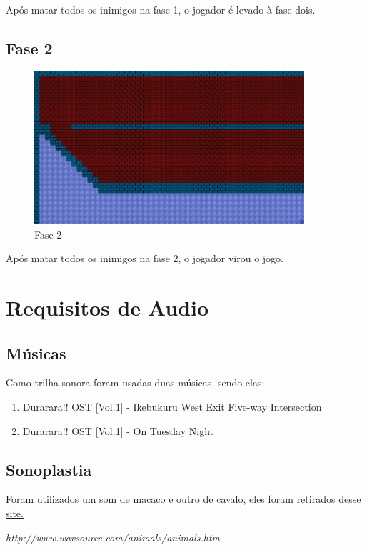 \documentclass[12pt]{article}
\begin{document}
Após matar todos os inimigos na fase 1, o jogador é levado à fase dois.

\subsection{Fase 2}

\begin{figure}[H]
        \centering
        \includegraphics[width=100mm]{map2.png}
        \caption{Fase 2}
        \label{m2}
\end{figure}

Após matar todos os inimigos na fase 2, o jogador virou o jogo.

\section{Requisitos de Audio}

\subsection{Músicas}

Como trilha sonora foram usadas duas músicas, sendo elas:

\begin{enumerate}
  \item Durarara!! OST [Vol.1] - Ikebukuru West Exit Five-way Intersection
  \item Durarara!! OST [Vol.1] - On Tuesday Night
\end{enumerate}

\subsection{Sonoplastia}

Foram utilizados um som de macaco e outro de cavalo, eles foram retirados
\href{http://www.wavsource.com/animals/animals.htm}{desse site.}

\emph{http://www.wavsource.com/animals/animals.htm}
\end{document}

